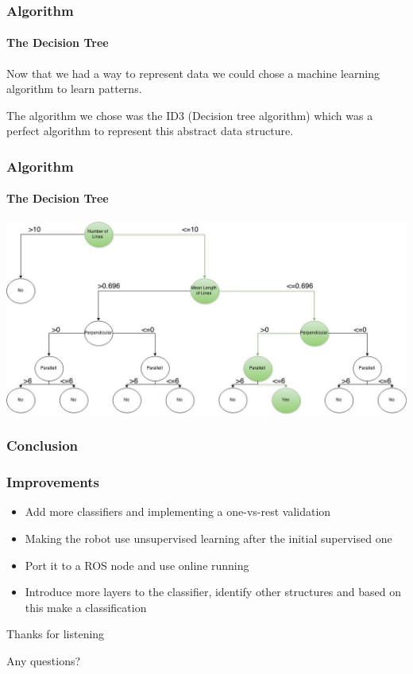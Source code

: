\documentclass{beamer}
\begin{document}
\begin{frame}
\frametitle{Algorithm}
\framesubtitle{The Decision Tree}

Now that we had a way to represent data we could chose a machine learning algorithm to learn patterns.

\pause
\vspace{10pt}

The algorithm we chose was the ID3 (Decision tree algorithm) which was a perfect algorithm to represent this abstract data structure.


\end{frame}

\begin{frame}[fragile]
\frametitle{Algorithm}
\framesubtitle{The Decision Tree}
\includegraphics[scale=0.3]{presimg/id3.jpg}

\end{frame}

\begin{frame}
\frametitle{Conclusion}

\end{frame}

\begin{frame}
\frametitle{Improvements}

\begin{itemize}
\item{Add more classifiers and implementing a one-vs-rest validation}
\pause
\item{Making the robot use unsupervised learning after the initial supervised one}
\pause
\item{Port it to a ROS node and use online running}
\pause
\item{Introduce more layers to the classifier, identify other structures and based on this make a classification}
\end{itemize}

\end{frame}

\begin{frame}

\centering

Thanks for listening

\vspace{10pt}

Any questions?

\end{frame}
\end{document}

